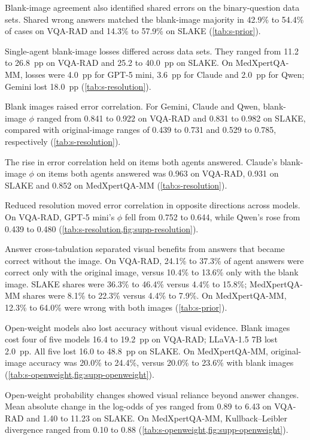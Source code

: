 Blank-image agreement also identified shared errors on the binary-question data sets.
Shared wrong answers matched the blank-image majority in 42.9\% to 54.4\% of cases on VQA-RAD and 14.3\% to 57.9\% on SLAKE (\cref{tab:s-prior}).

Single-agent blank-image losses differed across data sets.
They ranged from 11.2 to 26.8~pp on VQA-RAD and 25.2 to 40.0~pp on SLAKE.
On MedXpertQA-MM, losses were 4.0~pp for GPT-5 mini, 3.6~pp for Claude and 2.0~pp for Qwen; Gemini lost 18.0~pp (\cref{tab:s-resolution}).

Blank images raised error correlation.
For Gemini, Claude and Qwen, blank-image $\phi$ ranged from 0.841 to 0.922 on VQA-RAD and 0.831 to 0.982 on SLAKE, compared with original-image ranges of 0.439 to 0.731 and 0.529 to 0.785, respectively (\cref{tab:s-resolution}).

The rise in error correlation held on items both agents answered.
Claude's blank-image $\phi$ on items both agents answered was 0.963 on VQA-RAD, 0.931 on SLAKE and 0.852 on MedXpertQA-MM (\cref{tab:s-resolution}).

Reduced resolution moved error correlation in opposite directions across models.
On VQA-RAD, GPT-5 mini's $\phi$ fell from 0.752 to 0.644, while Qwen's rose from 0.439 to 0.480 (\cref{tab:s-resolution,fig:supp-resolution}).

Answer cross-tabulation separated visual benefits from answers that became correct without the image.
On VQA-RAD, 24.1\% to 37.3\% of agent answers were correct only with the original image, versus 10.4\% to 13.6\% only with the blank image.
SLAKE shares were 36.3\% to 46.4\% versus 4.4\% to 15.8\%; MedXpertQA-MM shares were 8.1\% to 22.3\% versus 4.4\% to 7.9\%.
On MedXpertQA-MM, 12.3\% to 64.0\% were wrong with both images (\cref{tab:s-prior}).

Open-weight models also lost accuracy without visual evidence.
Blank images cost four of five models 16.4 to 19.2~pp on VQA-RAD; LLaVA-1.5 7B lost 2.0~pp.
All five lost 16.0 to 48.8~pp on SLAKE.
On MedXpertQA-MM, original-image accuracy was 20.0\% to 24.4\%, versus 20.0\% to 23.6\% with blank images (\cref{tab:s-openweight,fig:supp-openweight}).

Open-weight probability changes showed visual reliance beyond answer changes.
Mean absolute change in the log-odds of yes ranged from 0.89 to 6.43 on VQA-RAD and 1.40 to 11.23 on SLAKE.
On MedXpertQA-MM, Kullback--Leibler divergence ranged from 0.10 to 0.88 (\cref{tab:s-openweight,fig:supp-openweight}).

